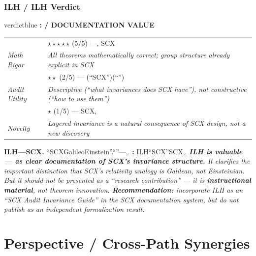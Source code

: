 \documentclass[11pt,a4paper]{article}
\theoremstyle{plain}
\theoremstyle{definition}
\theoremstyle{remark}
\begin{document}
{\section{ILH / ILH Verdict}
\label{sec:ilh-verdict}
\begin{verdictbox}{verdictblue}
\textbf{: / DOCUMENTATION VALUE}
\medskip
\begin{tabular}{p{3cm} p{11cm}}
 & $\star\star\star\star\star$ (5/5) ---, SCX \\
\textit{Math Rigor} & \textit{All theorems mathematically correct; group structure already explicit in SCX} \\
 & $\star\star$ (2/5) --- (``SCX'')(``'') \\
\textit{Audit Utility} & \textit{Descriptive (``what invariances does SCX have''), not constructive (``how to use them'')} \\
 & $\star$ (1/5) --- SCX, \\
\textit{Novelty} & \textit{Layered invariance is a natural consequence of SCX design, not a new discovery} \\
\end{tabular}
\medskip
\textbf{ILH---SCX.} ``SCXGalileoEinstein''.``''---,.
\textbf{: } ILH``SCX''SCX,.
\textit{\textbf{ILH is valuable --- as clear documentation of SCX's invariance structure.} It clarifies the important distinction that SCX's relativity analogy is Galilean, not Einsteinian. But it should not be presented as a ``research contribution'' --- it is \textbf{instructional material}, not theorem innovation. \textbf{Recommendation:} incorporate ILH as an ``SCX Audit Invariance Guide'' in the SCX documentation system, but do not publish as an independent formalization result.}
\end{verdictbox}
\newpage
\part{Perspective / Cross-Path Synergies}
\label{part:synergy}
}
\end{document}
